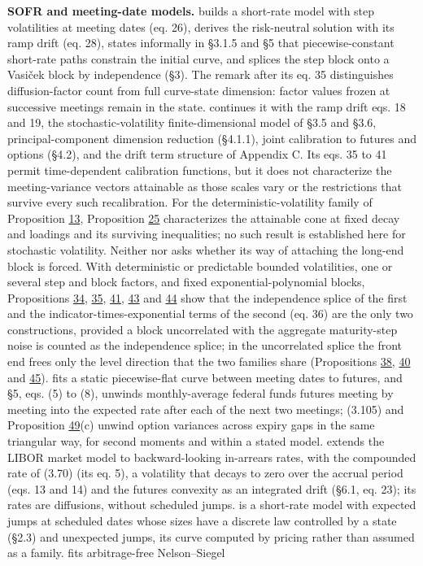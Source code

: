 \documentclass[11pt]{article}
\begin{document}
\textbf{SOFR and meeting-date models.} \cite{gellert2021short} builds a short-rate model with step volatilities at meeting dates (eq. 26), derives the risk-neutral solution with its ramp drift (eq. 28), states informally in §3.1.5 and §5 that piecewise-constant short-rate paths constrain the initial curve, and splices the step block onto a Vasiček block by independence (§3). The remark after its eq. 35 distinguishes diffusion-factor count from full curve-state dimension: factor values frozen at successive meetings remain in the state. \cite{brace2024sofr} continues it with the ramp drift eqs. 18 and 19, the stochastic-volatility finite-dimensional model of §3.5 and §3.6, principal-component dimension reduction (§4.1.1), joint calibration to futures and options (§4.2), and the drift term structure of Appendix C. Its eqs. 35 to 41 permit time-dependent calibration functions, but it does not characterize the meeting-variance vectors attainable as those scales vary or the restrictions that survive every such recalibration. For the deterministic-volatility family of Proposition \hyperref[res:Proposition-13]{13}, Proposition \hyperref[res:Proposition-25]{25} characterizes the attainable cone at fixed decay and loadings and its surviving inequalities; no such result is established here for stochastic volatility. Neither \cite{gellert2021short} nor \cite{brace2024sofr} asks whether its way of attaching the long-end block is forced. With deterministic or predictable bounded volatilities, one or several step and block factors, and fixed exponential-polynomial blocks, Propositions \hyperref[res:Proposition-34]{34}, \hyperref[res:Proposition-35]{35}, \hyperref[res:Proposition-41]{41}, \hyperref[res:Proposition-43]{43} and \hyperref[res:Proposition-44]{44} show that the independence splice of the first and the indicator-times-exponential terms of the second (eq. 36) are the only two constructions, provided a block uncorrelated with the aggregate maturity-step noise is counted as the independence splice; in the uncorrelated splice the front end frees only the level direction that the two families share (Propositions \hyperref[res:Proposition-38]{38}, \hyperref[res:Proposition-40]{40} and \hyperref[res:Proposition-45]{45}). \cite{heitfield2019inferring} fits a static piecewise-flat curve between meeting dates to futures, and \cite{gurkaynak2007market} §5, eqs. (5) to (8), unwinds monthly-average federal funds futures meeting by meeting into the expected rate after each of the next two meetings; (3.105) and Proposition \hyperref[res:Proposition-49]{49}(c) unwind option variances across expiry gaps in the same triangular way, for second moments and within a stated model. \cite{lyashenko2019looking} extends the LIBOR market model to backward-looking in-arrears rates, with the compounded rate of (3.70) (its eq. 5), a volatility that decays to zero over the accrual period (eqs. 13 and 14) and the futures convexity as an integrated drift (§6.1, eq. 23); its rates are diffusions, without scheduled jumps. \cite{backwell2021expected} is a short-rate model with expected jumps at scheduled dates whose sizes have a discrete law controlled by a state (§2.3) and unexpected jumps, its curve computed by pricing rather than assumed as a family. \cite{skov2021dynamic} fits arbitrage-free Nelson--Siegel 
\end{document}
